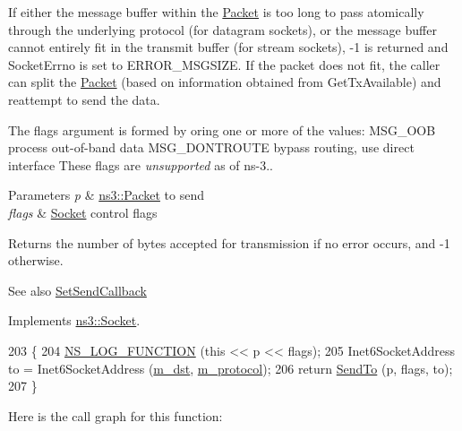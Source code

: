 If either the message buffer within the \hyperlink{classns3_1_1Packet}{Packet} is too long to pass atomically through the underlying protocol (for datagram sockets), or the message buffer cannot entirely fit in the transmit buffer (for stream sockets), -\/1 is returned and Socket\+Errno is set to E\+R\+R\+O\+R\+\_\+\+M\+S\+G\+S\+I\+ZE. If the packet does not fit, the caller can split the \hyperlink{classns3_1_1Packet}{Packet} (based on information obtained from Get\+Tx\+Available) and reattempt to send the data.

The flags argument is formed by or\textquotesingle{}ing one or more of the values\+: M\+S\+G\+\_\+\+O\+OB process out-\/of-\/band data M\+S\+G\+\_\+\+D\+O\+N\+T\+R\+O\+U\+TE bypass routing, use direct interface These flags are {\itshape unsupported} as of ns-\/3..


\begin{DoxyParams}{Parameters}
{\em p} & \hyperlink{classns3_1_1Packet}{ns3\+::\+Packet} to send \\
\hline
{\em flags} & \hyperlink{classns3_1_1Socket}{Socket} control flags \\
\hline
\end{DoxyParams}
\begin{DoxyReturn}{Returns}
the number of bytes accepted for transmission if no error occurs, and -\/1 otherwise.
\end{DoxyReturn}
\begin{DoxySeeAlso}{See also}
\hyperlink{classns3_1_1Socket_a85ff5c8cc7d242823f301b49264c68a4}{Set\+Send\+Callback} 
\end{DoxySeeAlso}


Implements \hyperlink{classns3_1_1Socket_a036901c8f485fe5b6eab93b7f2ec289d}{ns3\+::\+Socket}.


\begin{DoxyCode}
203 \{
204   \hyperlink{log-macros-disabled_8h_a90b90d5bad1f39cb1b64923ea94c0761}{NS\_LOG\_FUNCTION} (\textcolor{keyword}{this} << p << flags);
205   Inet6SocketAddress to = Inet6SocketAddress (\hyperlink{classns3_1_1Ipv6RawSocketImpl_ac1bd7e150da6118befd78831b483c0ca}{m\_dst}, \hyperlink{classns3_1_1Ipv6RawSocketImpl_ac745a953c5ec673bd89b170eaadab548}{m\_protocol});
206   \textcolor{keywordflow}{return} \hyperlink{classns3_1_1Ipv6RawSocketImpl_aadff84e3c8a3ce3bc4f10a3d7a4dbac8}{SendTo} (p, flags, to);
207 \}
\end{DoxyCode}


Here is the call graph for this function\+:


